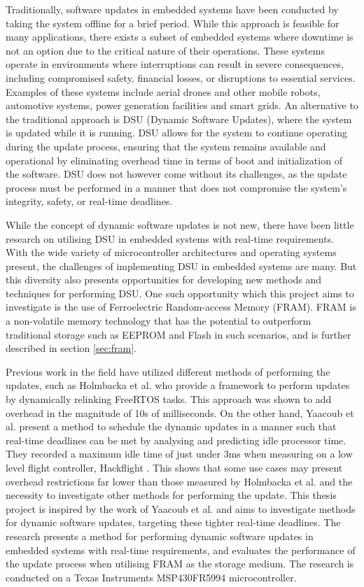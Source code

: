 Traditionally, software updates in embedded systems have been conducted by taking the system offline for a brief period. While this approach is feasible for many applications, there exists a subset of embedded systems where downtime is not an option due to the critical nature of their operations. These systems operate in environments where interruptions can result in severe consequences, including compromised safety, financial losses, or disruptions to essential services. Examples of these systems include aerial drones and other mobile robots, automotive systems, power generation facilities and smart grids. An alternative to the traditional approach is DSU (Dynamic Software Updates), where the system is updated while it is running. DSU allows for the system to continue operating during the update process, ensuring that the system remains available and operational by eliminating overhead time in terms of boot and initialization of the software. DSU does not however come without its challenges, as the update process must be performed in a manner that does not compromise the system's integrity, safety, or real-time deadlines.

While the concept of dynamic software updates is not new, there have been little research on utilising DSU in embedded systems with real-time requirements. With the wide variety of microcontroller architectures and operating systems present, the challenges of implementing DSU in embedded systems are many. But this diversity also presents opportunities for developing new methods and techniques for performing DSU. One such opportunity which this project aims to investigate is the use of Ferroelectric Random-access Memory (FRAM). FRAM is a non-volatile memory technology that has the potential to outperform traditional storage such as EEPROM and Flash in such scenarios, and is further described in section \ref{sec:fram}.

Previous work in the field have utilized different methods of performing the updates, such as Holmbacka et al. \cite{dynUpdateFramework} who provide a framework to perform updates by dynamically relinking FreeRTOS tasks. This approach was shown to add overhead in the magnitude of 10s of milliseconds. On the other hand, Yaacoub et al. \cite{NeRTA} present a method to schedule the dynamic updates in a manner such that real-time deadlines can be met by analysing and predicting idle processor time. They recorded a maximum idle time of just under 3ms when measuring on a low level flight controller, Hackflight \cite{hackflight}. This shows that some use cases may present overhead restrictions far lower than those measured by Holmbacka et al. and the necessity to investigate other methods for performing the update. This thesis project is inspired by the work of Yaacoub et al. and aims to investigate methods for dynamic software updates, targeting these tighter real-time deadlines. The research presents a method for performing dynamic software updates in embedded systems with real-time requirements, and evaluates the performance of the update process when utilising FRAM as the storage medium. The research is conducted on a Texas Instruments MSP430FR5994 microcontroller.

